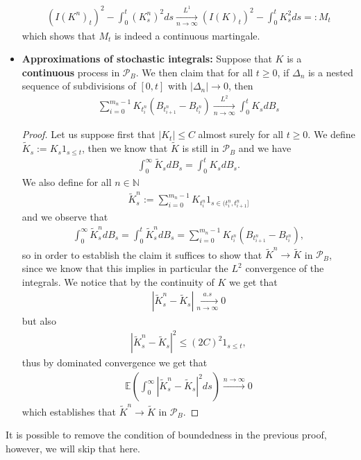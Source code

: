\documentclass[../mainfile.tex]{subfiles}
\begin{document}
\begin{itemize}
\begin{align*}
(I(K^n)_t)^2 - \int_0^t (K_s^n)^2 ds \xrightarrow[n \to \infty]{L^1} (I(K)_t)^2 - \int_0^t K_s^2 ds =:M_t
\end{align*}
which shows that $M_t$ is indeed a continuous martingale. 
\newpage
\item \textbf{Approximations of stochastic integrals:} Suppose that $K$ is a \textbf{continuous} process in $\mathcal{P}_B$. We then claim that for all $t \geq 0$, if $\Delta_n$ is a nested sequence of subdivisions of $[0,t]$ with $|\Delta_n| \to 0$, then 
\begin{align*}
\sum_{i=0}^{m_n-1} K_{t_i^n} ( B_{t_{i+1}^n}-B_{t_i^n}) \xrightarrow[n \to \infty]{L^2} \int_0^t K_s dB_s
\end{align*}
\begin{proof}
Let us suppose first that $|K_t| \leq C$ almost surely for all $t \geq 0$. We define $\tilde{K}_s:= K_s 1_{s \leq t}$, then we know that $\tilde{K}$ is still in $\mathcal{P}_B$ and we have \begin{align*}
\int_0^\infty \tilde{K}_s dB_s = \int_0^t K_s dB_s.
\end{align*} We also define for all $n \in \mathbb{N}$ \begin{align*}
\tilde{K}_s^n := \sum_{i=0}^{m_n-1} K_{t_i^n} 1_{s \in (t_i^n, t_{i+1}^n]}
\end{align*}
and we observe that 
\begin{align*}
\int_0^\infty \tilde{K}_s^n dB_s = \int_0^t \tilde{K}_s^n dB_s = \sum_{i=0}^{m_n-1} K_{t_i^n} (B_{t_{i+1}^n}-B_{t_i^n}),
\end{align*}
so in order to establish the claim it suffices to show that $\tilde{K}^n \to \tilde{K}$ in $\mathcal{P}_B$, since we know that this implies in particular the $L^2$ convergence of the integrals. We notice that by the continuity of $K$ we get that 
\begin{align*}
|\tilde{K}_s^n-\tilde{K}_s | \xrightarrow[n \to \infty]{a.s} 0
\end{align*}
but also
\begin{align*}
|\tilde{K}_s^n-\tilde{K}_s |^2 \leq (2C)^2 1_{s \leq t},
\end{align*}
thus by dominated convergence we get that  \begin{align*}
\mathbb{E} \left( \int_0^\infty |\tilde{K}_s^n-\tilde{K}_s|^2ds \right) \overset{n \to \infty}\to 0
\end{align*}
which establishes that $\tilde{K}^n \to \tilde{K}$ in $\mathcal{P}_B$. 
\end{proof}
\end{itemize}
\begin{rem} It is possible to remove the condition of boundedness in the previous proof, however, we will skip that here. 
\end{rem}
\newpage
\end{document}
